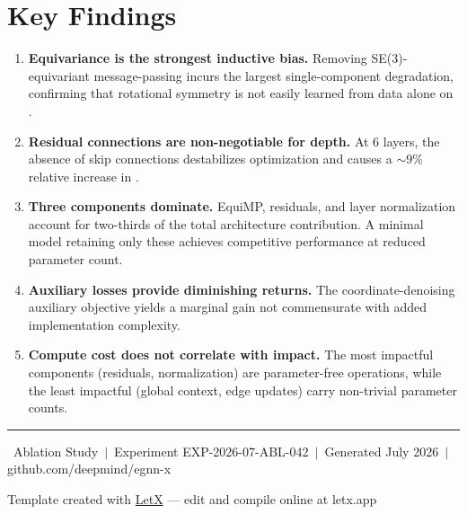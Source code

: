 \section{Key Findings}

\begin{enumerate}[nosep,leftmargin=*,itemsep=2pt]
  \item \textbf{Equivariance is the strongest inductive bias.} Removing SE(3)-equivariant
        message-passing incurs the largest single-component degradation, confirming that
        rotational symmetry is not easily learned from data alone on \dataset.

  \item \textbf{Residual connections are non-negotiable for depth.} At 6 layers, the
        absence of skip connections destabilizes optimization and causes a \(\sim 9\%\)
        relative increase in \metric.

  \item \textbf{Three components dominate.} EquiMP, residuals, and layer normalization
        account for two-thirds of the total architecture contribution. A minimal model
        retaining only these achieves competitive performance at reduced parameter count.

  \item \textbf{Auxiliary losses provide diminishing returns.} The coordinate-denoising
        auxiliary objective yields a marginal gain not commensurate with added
        implementation complexity.

  \item \textbf{Compute cost does not correlate with impact.} The most impactful
        components (residuals, normalization) are parameter-free operations, while the
        least impactful (global context, edge updates) carry non-trivial parameter counts.
\end{enumerate}

\vspace{6pt}

\begin{center}
  {\color{accent!35}\rule{\textwidth}{0.6pt}}
  \vspace{4pt}

  {\footnotesize\color{slatelight}
    \modelname\ Ablation Study \,\(\mid\)\, Experiment EXP-2026-07-ABL-042
    \,\(\mid\)\, Generated July 2026
    \,\(\mid\)\, \faGithub\; github.com/deepmind/egnn-x
  }

  \vspace{2pt}
  {\footnotesize\color{slatelight!60}
    Template created with \href{https://letx.app}{LetX} ---
    edit and compile online at letx.app
  }
\end{center}
